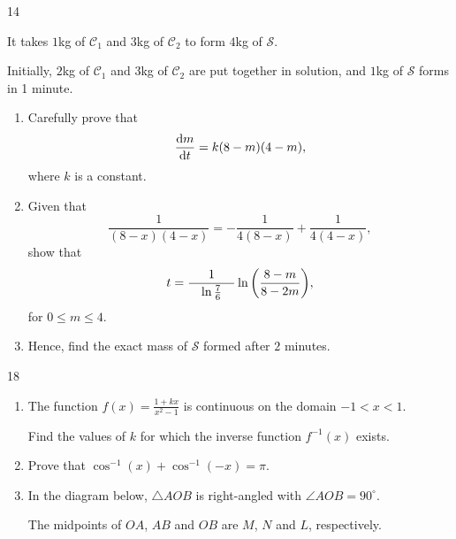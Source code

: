 \documentclass[12pt]{extarticle}
\begin{document}
\begin{shortanswer}
\begin{bookletquestion}{14}
\begin{enumerate}
			      It takes $1$kg of $\mathcal{C}_1$ and $3$kg of $\mathcal{C}_2$ to form $4$kg of $\mathcal{S}$.

			      Initially, $2$kg of $\mathcal{C}_1$ and $3$kg of $\mathcal{C}_2$ are put together in solution, and $1$kg of $\mathcal{S}$ forms in 1 minute.
			      \begin{enumerate}
				      \item {} Carefully prove that
				            \[\dv{m}{t}=k(8-m)(4-m),\]
				            where $k$ is a constant.
				      \item {} Given that
				            \[\dfrac{1}{(8-x)(4-x)}=-\dfrac{1}{4(8-x)}+\dfrac{1}{4(4-x)},\]
				            show that
				            \[t=\dfrac{1}{\quad\ln\frac{7}{6}\quad}\ln\qty(\dfrac{8-m}{8-2m}),\]
				            for $0\leq m \leq 4$.
				      \item {} Hence, find the exact mass of $\mathcal{S}$ formed after $2$ minutes.
			      \end{enumerate}
		\end{enumerate}
		\questionend
	\end{bookletquestion}
	\pagebreak
	\begin{bookletquestion}{18}
		\begin{enumerate}
			\item {} The function $f(x)=\frac{1+kx}{x^2-1}$ is continuous on the domain $-1<x<1$.

			      Find the values of $k$ for which the inverse function $f^{-1}(x)$ exists.
			\item {} Prove that $\cos^{-1}(x)+\cos^{-1}(-x)=\pi$.
			\item In the diagram below, $\triangle{AOB}$ is right-angled with $\angle{AOB}=90^\circ$.

			      The midpoints of $OA$, $AB$ and $OB$ are $M$, $N$ and $L$, respectively.


\end{enumerate}
\end{bookletquestion}
\end{shortanswer}
\end{document}
